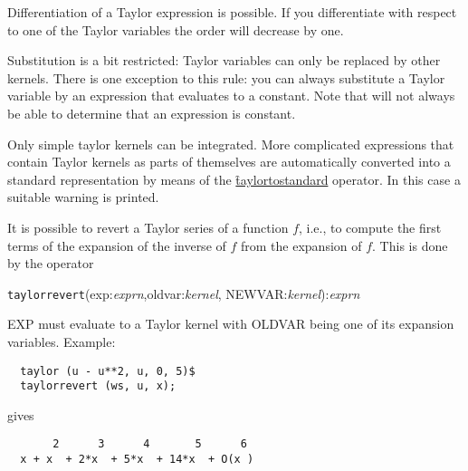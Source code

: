 Differentiation of a Taylor expression is possible.  If you
differentiate with respect to one of the Taylor variables the order
will decrease by one.

Substitution is a bit restricted: Taylor variables can only be replaced
by other kernels.  There is one exception to this rule: you can always
substitute a Taylor variable by an expression that evaluates to a
constant.  Note that \REDUCE{} will not always be able to determine
that an expression is constant.

Only simple taylor kernels can be integrated. More complicated
expressions that contain Taylor kernels as parts of themselves are
automatically converted into a standard representation by means of the
\hyperlink{operator:TAYLORTOSTANDARD}{\f{taylortostandard}} operator. 
In this case a suitable warning is printed.

 It is possible to revert a Taylor
series of a function $f$, i.e., to compute the first terms of the
expansion of the inverse of $f$ from the expansion of $f$. This is
done by the operator

\hypertarget{operator:TAYLORREVERT}{}
\hspace*{2em} \texttt{taylorrevert}(exp:{\em exprn},oldvar:{\em kernel},
                                 NEWVAR:{\em kernel}):{\em exprn}

EXP must evaluate to a Taylor kernel with OLDVAR being one of its
expansion variables. Example:
\begin{verbatim}
  taylor (u - u**2, u, 0, 5)$
  taylorrevert (ws, u, x);
\end{verbatim}
gives
\begin{verbatim}
       2      3      4       5      6
  x + x  + 2*x  + 5*x  + 14*x  + O(x )
\end{verbatim}

